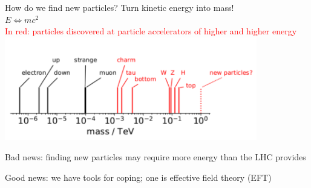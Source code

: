 \documentclass[professionalfont,fleqn]{beamer}
\begin{document}
\begin{frame}{How do we find new particles?}
  \centering
  Turn kinetic energy into mass!\\
  $E \Longleftrightarrow mc^2$\\
  \textcolor{red}{In red: particles discovered at particle accelerators of higher and higher energy}
  \includegraphics[width=11cm]{figures/particles}
\end{frame}

\begin{frame}[standout]
  Bad news: finding new particles may require more energy than the LHC provides
  \vspace{2cm}

  Good news: we have tools for coping; one is effective field theory (EFT)
\end{frame}
\end{document}
